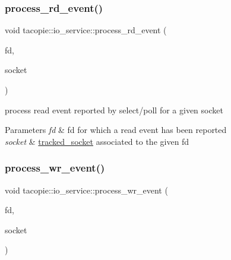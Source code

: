 \subsubsection{\texorpdfstring{process\+\_\+rd\+\_\+event()}{process\_rd\_event()}}
{\footnotesize\ttfamily void tacopie\+::io\+\_\+service\+::process\+\_\+rd\+\_\+event (\begin{DoxyParamCaption}\item[{const \hyperlink{namespacetacopie_acce7ad26b2d30156b1e6fa353f727026}{fd\+\_\+t} \&}]{fd,  }\item[{\hyperlink{structtacopie_1_1io__service_1_1tracked__socket}{tracked\+\_\+socket} \&}]{socket }\end{DoxyParamCaption})\hspace{0.3cm}{\ttfamily [private]}}

process read event reported by select/poll for a given socket


\begin{DoxyParams}{Parameters}
{\em fd} & fd for which a read event has been reported \\
\hline
{\em socket} & \hyperlink{structtacopie_1_1io__service_1_1tracked__socket}{tracked\+\_\+socket} associated to the given fd \\
\hline
\end{DoxyParams}
\mbox{\label{classtacopie_1_1io__service_a55e334cdf75187b9296c03447e32a63f}} 
\subsubsection{\texorpdfstring{process\+\_\+wr\+\_\+event()}{process\_wr\_event()}}
{\footnotesize\ttfamily void tacopie\+::io\+\_\+service\+::process\+\_\+wr\+\_\+event (\begin{DoxyParamCaption}\item[{const \hyperlink{namespacetacopie_acce7ad26b2d30156b1e6fa353f727026}{fd\+\_\+t} \&}]{fd,  }\item[{\hyperlink{structtacopie_1_1io__service_1_1tracked__socket}{tracked\+\_\+socket} \&}]{socket }\end{DoxyParamCaption})\hspace{0.3cm}{\ttfamily [private]}}

